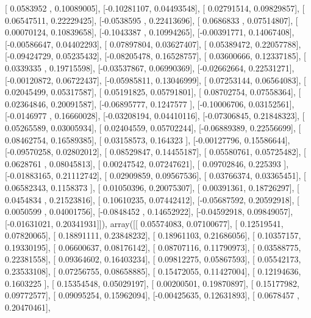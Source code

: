 \documentclass{article}
\begin{document}
       [ 0.0583952 ,  0.10089005],
       [-0.10281107,  0.04493548],
       [ 0.02791514,  0.09829857],
       [ 0.06547511,  0.22229425],
       [-0.0538595 ,  0.22413696],
       [ 0.0686833 ,  0.07514807],
       [ 0.00070124,  0.10839658],
       [-0.1043387 ,  0.10994265],
       [-0.00391771,  0.14067408],
       [-0.00586647,  0.04402293],
       [ 0.07897804,  0.03627407],
       [ 0.05389472,  0.22057788],
       [-0.09424729,  0.05235432],
       [-0.08205478,  0.16528757],
       [ 0.03600666,  0.12337185],
       [ 0.0339335 ,  0.19715598],
       [-0.03537867,  0.06990369],
       [-0.02662664,  0.22531271],
       [-0.00120872,  0.06722437],
       [-0.05985811,  0.13046999],
       [ 0.07253144,  0.06564083],
       [ 0.02045499,  0.05317587],
       [ 0.05191825,  0.05791801],
       [ 0.08702754,  0.07558364],
       [ 0.02364846,  0.20091587],
       [-0.06895777,  0.1247577 ],
       [-0.10006706,  0.03152561],
       [-0.0146977 ,  0.16660028],
       [-0.03208194,  0.04410116],
       [-0.07306845,  0.21848323],
       [ 0.05265589,  0.03005934],
       [ 0.02404559,  0.05702244],
       [-0.06889389,  0.22556699],
       [ 0.08462754,  0.16589385],
       [ 0.03158573,  0.164323  ],
       [-0.00127796,  0.15586644],
       [-0.09570258,  0.02802012],
       [ 0.08529847,  0.14455187],
       [ 0.05580761,  0.05725482],
       [ 0.0628761 ,  0.08045813],
       [ 0.00247542,  0.07247621],
       [ 0.09702846,  0.225393  ],
       [-0.01883165,  0.21112742],
       [ 0.02909859,  0.09567536],
       [ 0.03766374,  0.03365451],
       [ 0.06582343,  0.1158373 ],
       [ 0.01050396,  0.20075307],
       [ 0.00391361,  0.18726297],
       [ 0.0454834 ,  0.21523816],
       [ 0.10610235,  0.07442412],
       [-0.05687592,  0.20592918],
       [ 0.0050599 ,  0.04001756],
       [-0.0848452 ,  0.14652922],
       [-0.04592918,  0.09849057],
       [-0.01631021,  0.20341931]]), array([[ 0.05574083,  0.07100677],
       [ 0.12519541,  0.07820065],
       [ 0.18891111,  0.23848232],
       [ 0.18961103,  0.21686056],
       [ 0.10357157,  0.19330195],
       [ 0.06600637,  0.08176142],
       [ 0.08707116,  0.11790973],
       [ 0.03588775,  0.22381558],
       [ 0.09364602,  0.16403234],
       [ 0.09812275,  0.05867593],
       [ 0.05542173,  0.23533108],
       [ 0.07256755,  0.08658885],
       [ 0.15472055,  0.11427004],
       [ 0.12194636,  0.1603225 ],
       [ 0.15354548,  0.05029197],
       [ 0.00200501,  0.19870897],
       [ 0.15177982,  0.09772577],
       [ 0.09095254,  0.15962094],
       [-0.00425635,  0.12631893],
       [ 0.0678457 ,  0.20470461],
\end{document}
